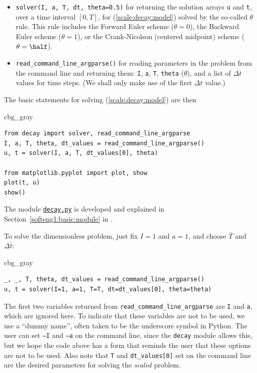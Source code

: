 \documentclass[graybox,envcountchap,sectrefs,final]{svmonodo}
\newenvironment{_cod_tight}[1]{
   \def\FrameCommand{\colorbox{#1}}
   \FrameRule0.6pt\MakeFramed {\FrameRestore}\vskip3mm}
   {\vskip0mm\endMakeFramed}
\newenvironment{cod}[1]{
\bgroup\rmfamily
\fboxsep=0mm\relax
\begin{_cod_tight}{#1}
\list{}{\parsep=-2mm\parskip=0mm\topsep=0pt\leftmargin=2mm
\rightmargin=2\leftmargin\leftmargin=4pt\relax}
\item\relax}
{\endlist\end{_cod_tight}\egroup}
\begin{document}
\begin{itemize}
  \item \texttt{solver(I, a, T, dt, theta=0.5)} for returning the solution arrays
    \texttt{u} and \texttt{t}, over a time interval $[0,T]$,
    for (\ref{scale:decay:model}) solved by the so-called
    $\theta$ rule. This rule includes the Forward Euler scheme ($\theta=0$),
    the Backward Euler scheme ($\theta=1$), or the Crank-Nicolson
    (centered midpoint) scheme ($\theta=\half$).

  \item \Verb!read_command_line_argparse()! for reading parameters in the problem
    from the command line and returning them: \texttt{I}, \texttt{a}, \texttt{T}, \texttt{theta} ($\theta$),
    and a list of $\Delta t$ values for time steps. (We shall only make
    use of the first $\Delta t$ value.)
\end{itemize}

\noindent
The basic statements for solving (\ref{scale:decay:model}) are
then

\begin{cod}{cbg_gray}\begin{Verbatim}[numbers=none,fontsize=\fontsize{9pt}{9pt},baselinestretch=0.95,xleftmargin=2mm]
from decay import solver, read_command_line_argparse
I, a, T, theta, dt_values = read_command_line_argparse()
u, t = solver(I, a, T, dt_values[0], theta)

from matplotlib.pyplot import plot, show
plot(t, u)
show()
\end{Verbatim}
\end{cod}
\noindent
The module \href{{http://tinyurl.com/o8pb3yy/decay.py}}{\nolinkurl{decay.py}} is developed
and explained in
Section~\ref{softeng1:basic:module} in \cite{Langtangen_decay}.

To solve the dimensionless problem, just fix $I=1$ and $a=1$,
and choose $\bar T$ and $\Delta\bar t$:

\begin{cod}{cbg_gray}\begin{Verbatim}[numbers=none,fontsize=\fontsize{9pt}{9pt},baselinestretch=0.95,xleftmargin=2mm]
_, _, T, theta, dt_values = read_command_line_argparse()
u, t = solver(I=1, a=1, T=T, dt=dt_values[0], theta=theta)
\end{Verbatim}
\end{cod}
\noindent
The first two variables returned from \Verb!read_command_line_argparse!
are \texttt{I} and \texttt{a}, which are ignored here. To indicate that these
variables are not to be used, we use a
``dummy name'', often taken to be the underscore symbol in
Python. The user can set \texttt{--I} and \texttt{--a} on the command line, since
the \texttt{decay} module allows this, but we hope the code above has a form
that reminds the user that these options are not to be used.
Also note that \texttt{T} and \Verb!dt_values[0]! set on the command line are
the desired parameters for solving the \emph{scaled} problem.
\end{document}
